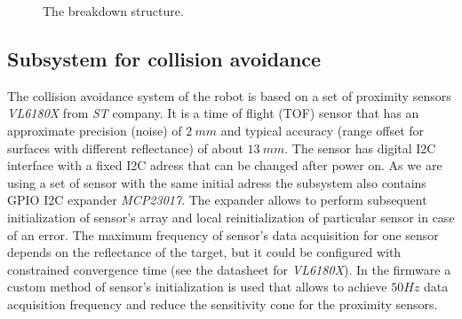 \documentclass[a4paper,12pt]{article} %
\begin{document}
\begin{figure}[H]
\caption{The breakdown structure.}
\label{ris:scheme}
\end{figure}

\subsection{Subsystem for collision avoidance}
The collision avoidance system of the robot is based on a set of proximity sensors \textit{VL6180X} from \textit{ST} company. It is a time of flight (TOF) sensor that has an approximate precision (noise) of $2\:mm$ and typical accuracy (range offset for surfaces with different reflectance) of about $13\:mm$. The sensor has digital I2C interface with a fixed I2C adress that can be changed after power on. As we are using a set of sensor with the same initial adress the subsystem also contains GPIO I2C expander \textit{MCP23017}. The expander allows to perform subsequent initialization of sensor's array and local reinitialization of particular sensor in case of an error. The maximum frequency of sensor's data acquisition for one sensor depends on the reflectance of the target, but it could be configured with constrained convergence time (see the datasheet for \textit{VL6180X}). In the firmware a custom method of sensor's initialization is used that allows to achieve $50 Hz$ data acquisition frequency and reduce the sensitivity cone for the proximity sensors. 
\end{document}
